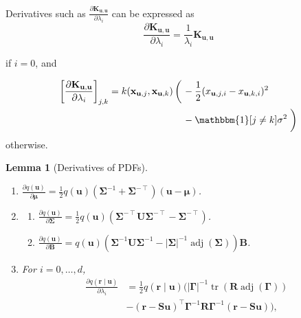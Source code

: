 \documentclass{mpaper}
\newtheorem{lemma}[theorem]{Lemma}
\DeclareMathOperator{\adj}{adj}
\DeclareMathOperator{\tr}{tr}
\newcommand{\Kuu}{\mathbf{K}_{\mathbf{u},\mathbf{u}}}
\begin{document}
Derivatives such as $\frac{\partial \Kuu}{\partial \lambda_i}$ can be expressed
as
\[
  \frac{\partial \Kuu}{\partial \lambda_i} = \frac{1}{\lambda_i}\Kuu
\]

if $i = 0$, and

\[
  \begin{split}
    \left[ \frac{\partial \Kuu}{\partial \lambda_i} \right]_{j,k} =
    k(\mathbf{x}_{\mathbf{u},j}, \mathbf{x}_{\mathbf{u},k})
    \left( \vphantom{\frac{1}{2}} \right. &-\frac{1}{2}(x_{\mathbf{u},j,i} -
    x_{\mathbf{u},k,i})^2 \\
    &- \mathbbm{1}[j \ne k]\sigma^2 \left. \vphantom{\frac{1}{2}} \right)
  \end{split}
\]
otherwise.

\begin{lemma}[Derivatives of PDFs] \label{lemma:derivatives}
  \leavevmode
  \begin{enumerate}
  \item $\frac{\partial q(\mathbf{u})}{\partial \bm\mu} =
    \frac{1}{2}q(\mathbf{u})(\bm\Sigma^{-1} + \bm\Sigma^{-\intercal})(\mathbf{u}
    - \bm\mu)$.
  \item
    \begin{enumerate}
    \item
      $\frac{\partial q(\mathbf{u})}{\partial \bm\Sigma} =
      \frac{1}{2}q(\mathbf{u})(\bm\Sigma^{-\intercal}\mathbf{U}\bm\Sigma^{-\intercal}
      - \bm\Sigma^{-\intercal})$.
    \item
      $\frac{\partial q(\mathbf{u})}{\partial \mathbf{B}} =
      q(\mathbf{u})(\bm\Sigma^{-1}\mathbf{U}\bm\Sigma^{-1} -
      |\bm\Sigma|^{-1}\adj(\bm\Sigma))\mathbf{B}$.
    \end{enumerate}
  \item For $i = 0, \dots, d$,
    \[
      \begin{split}
        \frac{\partial q(\mathbf{r} \mid \mathbf{u})}{\partial \lambda_i} &=
        \frac{1}{2}q(\mathbf{r} \mid \mathbf{u}) (|\bm\Gamma|^{-1}
          \tr(\mathbf{R} \adj(\bm\Gamma)) \\
          &- (\mathbf{r} -
          \mathbf{Su})^\intercal\bm\Gamma^{-1}\mathbf{R}\bm\Gamma^{-1}(\mathbf{r}
          - \mathbf{Su})),
      \end{split}
    \]
  \end{enumerate}
\end{lemma}
\end{document}
